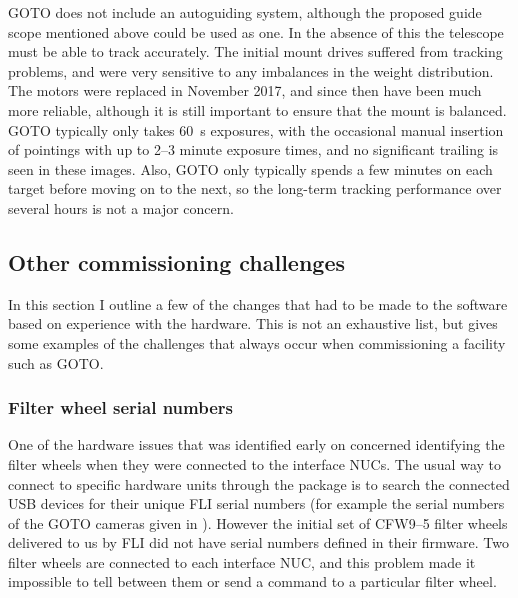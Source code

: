 \begin{colsection}
\begin{colsection}
GOTO does not include an autoguiding system, although the proposed guide scope mentioned above could be used as one. In the absence of this the telescope must be able to track accurately. The initial mount drives suffered from tracking problems, and were very sensitive to any imbalances in the weight distribution. The motors were replaced in November 2017, and since then have been much more reliable, although it is still important to ensure that the mount is balanced. GOTO typically only takes \SI{60}{\second} exposures, with the occasional manual insertion of pointings with up to 2--3 minute exposure times, and no significant trailing is seen in these images. Also, GOTO only typically spends a few minutes on each target before moving on to the next, so the long-term tracking performance over several hours is not a major concern.

\end{colsection}


\subsection{Other commissioning challenges}
\label{sec:challenges}
\begin{colsection}

In this section I outline a few of the changes that had to be made to the software based on experience with the hardware. This is not an exhaustive list, but gives some examples of the challenges that always occur when commissioning a facility such as GOTO.\@

\subsubsection{Filter wheel serial numbers}

One of the hardware issues that was identified early on concerned identifying the filter wheels when they were connected to the interface NUCs. The usual way to connect to specific hardware units through the  package is to search the connected USB devices for their unique FLI serial numbers (for example the serial numbers of the GOTO cameras given in ). However the initial set of CFW9--5 filter wheels delivered to us by FLI did not have serial numbers defined in their firmware. Two filter wheels are connected to each interface NUC, and this problem made it impossible to tell between them or send a command to a particular filter wheel.


\end{colsection}
\end{colsection}
